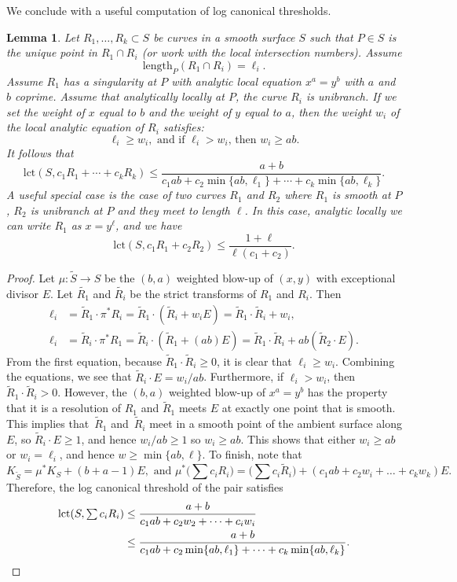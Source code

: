 \documentclass[JEP,XML,SOM,Unicode,NoFloatCountersInSection,published]{cedram}
\theoremstyle{plain}
\newtheorem{lemma}[theorem]{Lemma}
\theoremstyle{definition}
\newcommand\lct{\mathrm{lct}}
\newcommand\length{{\mathrm{length}}}
\newcommand\St{{\widetilde{S}}}
\newcommand\cl{{\colon}}
\begin{document}
We conclude with a useful computation of log canonical thresholds.

\begin{lemma}\label{lctcomputationfortwocomps}
Let $R_1,\dots,R_k\subset S$ be curves in a smooth surface $S$ such that $P\in S$ is the unique point in $R_1\cap R_i$ (or work with the local intersection numbers). Assume
\[
\length_P(R_1\cap R_i) = \ell_i.
\]
Assume $R_1$ has a singularity at $P$ with analytic local equation $x^a = y^b$ with $a$ and $b$ coprime. Assume that analytically locally at $P$, the curve $R_i$ is unibranch. If we set the weight of $x$ equal to $b$ and the weight of $y$ equal to $a$, then the weight $w_i$ of the local analytic equation of $R_i$ satisfies:
\[
\ell_i \ge w_i, \text{ and if } \ell_i > w_i \text{, then } w_i \ge ab.
\]
It follows that
\[
\lct(S,c_1R_1+\cdots+c_kR_k) \le \frac{a+b}{c_1ab+c_2\min\{ab,\ell_1\}+\cdots+c_k\min\{ab,\ell_k\}}.
\]
A useful special case is the case of two curves $R_1$ and $R_2$ where $R_1$ is smooth at $P$, $R_2$ is unibranch at $P$ and they meet to length $\ell$. In this case, analytic locally we can write $R_1$ as $x=y^\ell$, and we have
\[
\lct(S, c_1R_1 + c_2 R_2) \le \frac{1 + \ell}{\ell(c_1 + c_2)}.
\]
\end{lemma}

\begin{proof}
Let $\mu\cl\St\to S$ be the $(b,a)$ weighted blow-up of $(x,y)$ with exceptional divisor $E$. Let $\tilde{R_1}$ and $\tilde{R_i}$ be the strict transforms of $R_1$ and $R_i$. Then
\begin{align*}
\ell_i &= \tilde{R}_1 \cdot \pi^*R_i = \tilde{R}_1 \cdot (\tilde{R}_i +w_iE) = \tilde{R}_1 \cdot \tilde{R}_i + w_i,\\ \tag*{and}
\ell_i &= \tilde{R}_i \cdot \pi^*R_1 = \tilde{R}_i \cdot (\tilde{R}_1 + (ab)E) = \tilde{R}_1 \cdot \tilde{R}_i + ab(\tilde{R}_2\cdot E).
\end{align*}
From the first equation, because $\tilde{R}_1 \cdot \tilde{R}_i \ge 0$, it is clear that $\ell_i \ge w_i$. Combining the equations, we see that $\tilde{R}_i\cdot E = w_i/ab$. Furthermore, if $\ell_i > w_i$, then $\tilde{R}_1 \cdot \tilde{R}_i > 0$. However, the $(b,a)$ weighted blow-up of $x^a=y^b$ has the property that it is a resolution of $R_1$ and $\tilde{R}_1$ meets $E$ at exactly one point that is smooth. This implies that~$\tilde{R}_1$ and~$\tilde{R}_i$ meet in a smooth point of the ambient surface along $E$, so $\tilde{R}_i\cdot E \ge 1$, and hence $ w_i/ab \ge 1$ so $w_i \ge ab$. This shows that either $w_i \ge ab$ or $w_i = \ell_i$, and hence $w \ge \min\{ab, \ell\}$. To finish, note that
\[
K_{\St} = \mu^*K_S + (b+a-1)E,\text{ and }\mu^*\bigl(\textstyle\sum c_i R_i\bigr) \!=\! \bigl(\textstyle\sum c_i\tilde{R}_i\bigr)+ (c_1ab+c_2w_i+\dots+c_kw_k)E.
\]
Therefore, the log canonical threshold of the pair satisfies
\begin{align*}
\lct(S, \textstyle\sum c_i R_i) &\le \frac{a+b}{c_1ab + c_2 w_2+\dots+c_iw_i} \\
&\le \frac{a+b}{c_1ab+c_2\min\{ab,\ell_1\}+\cdots+c_k\min\{ab,\ell_k\}}.\qedhere
\end{align*}
\end{proof}
\end{document}
